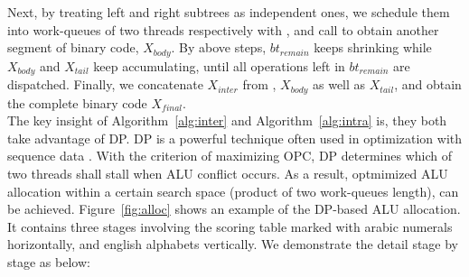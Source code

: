 Next, by treating left and right subtrees as independent ones, 
we schedule them into work-queues of two threads respectively with ,
and call  to obtain another segment of binary code, $X_{body}$.
By above steps, $bt_{remain}$ keeps shrinking while $X_{body}$ and $X_{tail}$ keep accumulating,
until all operations left in $bt_{remain}$ are dispatched.
Finally, we concatenate $X_{inter}$ from , $X_{body}$ as well as $X_{tail}$,
and obtain the complete binary code $X_{final}$.
\\\indent
The key insight of Algorithm~\ref{alg:inter} and Algorithm~\ref{alg:intra} is, they both take advantage of DP.
DP is a powerful technique often used in optimization with sequence data \cite{dpseq}.
With the criterion of maximizing OPC, DP determines which of two threads shall stall when ALU conflict occurs.
As a result, optmimized ALU allocation within a certain search space (product of two work-queues length), can be achieved.
Figure~\ref{fig:alloc} shows an example of the DP-based ALU allocation.
It contains three stages involving the scoring table marked with arabic numerals horizontally, and english alphabets vertically.
We demonstrate the detail stage by stage as below:
